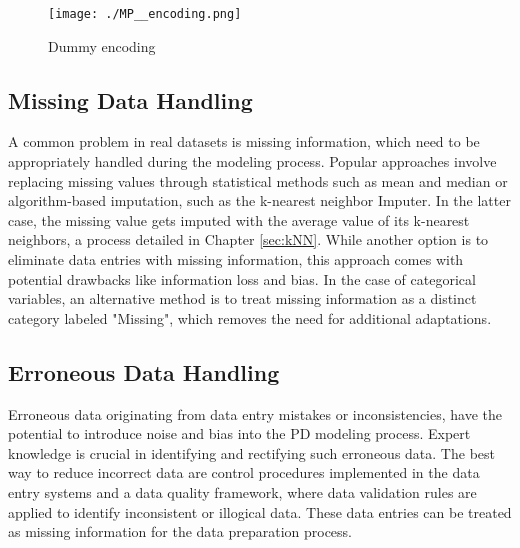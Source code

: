 \begin{figure}[H]
	\centering
	\texttt{[image: ./MP\_\_encoding.png]}
    \caption{Dummy encoding}
    \label{fig:dp_dumenc}
\end{figure}

\subsection{Missing Data Handling}
A common problem in real datasets is missing information, which need to be appropriately handled during the modeling process. Popular approaches involve replacing missing values through statistical methods such as mean and median or algorithm-based imputation, such as the k-nearest neighbor Imputer. In the latter case,  the missing value gets imputed with the average value of its k-nearest neighbors, a process detailed in Chapter \ref{sec:kNN}. While another option is to eliminate data entries with missing information, this approach comes with potential drawbacks like information loss and bias. In the case of categorical variables, an alternative method is to treat missing information as a distinct category labeled "Missing", which removes the need for additional adaptations. \cite[p.~207]{Python:2022}

\subsection{Erroneous Data Handling}
Erroneous data originating from data entry mistakes or inconsistencies, have the potential to introduce noise and bias into the PD modeling process. Expert knowledge is crucial in identifying and rectifying such erroneous data. The best way to reduce incorrect data are control procedures implemented in the data entry systems and a data quality framework, where data validation rules are applied to identify inconsistent or illogical data. These data entries can be treated as missing information for the data preparation process.


